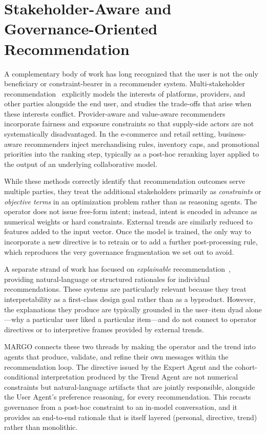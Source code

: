 \documentclass[master,english,final]{postech-ucs}
\begin{document}
\section{Stakeholder-Aware and Governance-Oriented Recommendation}
A complementary body of work has long recognized that the user is not the only beneficiary or constraint-bearer in a recommender system.
Multi-stakeholder recommendation~\cite{abdollahpouri2020multistakeholder} explicitly models the interests of platforms, providers, and other parties alongside the end user, and studies the trade-offs that arise when these interests conflict.
Provider-aware and value-aware recommenders~\cite{mehrotra2018fairness} incorporate fairness and exposure constraints so that supply-side actors are not systematically disadvantaged.
In the e-commerce and retail setting, business-aware recommenders inject merchandising rules, inventory caps, and promotional priorities into the ranking step, typically as a post-hoc reranking layer applied to the output of an underlying collaborative model.

While these methods correctly identify that recommendation outcomes serve multiple parties, they treat the additional stakeholders primarily as \emph{constraints} or \emph{objective terms} in an optimization problem rather than as reasoning agents.
The operator does not issue free-form intent; instead, intent is encoded in advance as numerical weights or hard constraints.
External trends are similarly reduced to features added to the input vector.
Once the model is trained, the only way to incorporate a new directive is to retrain or to add a further post-processing rule, which reproduces the very governance fragmentation we set out to avoid.

A separate strand of work has focused on \emph{explainable} recommendation~\cite{zhang2020explainable,li2024recexplainer}, providing natural-language or structured rationales for individual recommendations.
These systems are particularly relevant because they treat interpretability as a first-class design goal rather than as a byproduct.
However, the explanations they produce are typically grounded in the user--item dyad alone---why a particular user liked a particular item---and do not connect to operator directives or to interpretive frames provided by external trends.

MARGO connects these two threads by making the operator and the trend into agents that produce, validate, and refine their own messages within the recommendation loop.
The directive issued by the Expert Agent and the cohort-conditional interpretation produced by the Trend Agent are not numerical constraints but natural-language artifacts that are jointly responsible, alongside the User Agent's preference reasoning, for every recommendation.
This recasts governance from a post-hoc constraint to an in-model conversation, and it provides an end-to-end rationale that is itself layered (personal, directive, trend) rather than monolithic.
\end{document}
